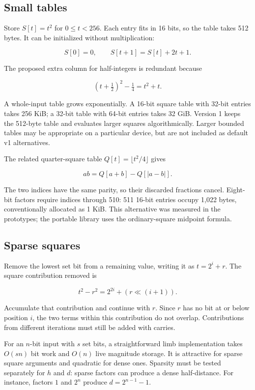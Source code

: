 \documentclass[11pt,a4paper]{article}
\begin{document}
\subsection{Small tables}

Store $S[t]=t^2$ for $0\le t<256$. Each entry fits in 16 bits, so the table takes 512 bytes. It can be initialized without multiplication:

\[
S[0]=0,\qquad S[t+1]=S[t]+2t+1.
\]

The proposed extra column for half-integers is redundant because

\[
(t+\tfrac12)^2-\tfrac14=t^2+t.
\]

A whole-input table grows exponentially. A 16-bit square table with 32-bit entries takes 256 KiB; a 32-bit table with 64-bit entries takes 32 GiB. Version 1 keeps the 512-byte table and evaluates larger squares algorithmically. Larger bounded tables may be appropriate on a particular device, but are not included as default v1 alternatives.

The related quarter-square table $Q[t]=\lfloor t^2/4\rfloor$ gives

\[
ab=Q[a+b]-Q[|a-b|].
\]

The two indices have the same parity, so their discarded fractions cancel. Eight-bit factors require indices through 510: 511 16-bit entries occupy 1,022 bytes, conventionally allocated as 1 KiB. This alternative was measured in the prototypes; the portable library uses the ordinary-square midpoint formula.

\subsection{Sparse squares}

Remove the lowest set bit from a remaining value, writing it as $t=2^i+r$. The square contribution removed is

\[
t^2-r^2=2^{2i}+(r\ll(i+1)).
\]

Accumulate that contribution and continue with $r$. Since $r$ has no bit at or below position $i$, the two terms within this contribution do not overlap. Contributions from different iterations must still be added with carries.

For an $n$-bit input with $s$ set bits, a straightforward limb implementation takes $O(sn)$ bit work and $O(n)$ live magnitude storage. It is attractive for sparse square arguments and quadratic for dense ones. Sparsity must be tested separately for $h$ and $d$: sparse factors can produce a dense half-distance. For instance, factors $1$ and $2^n$ produce $d=2^{n-1}-1$.
\end{document}
